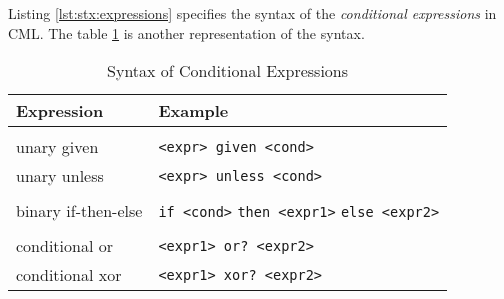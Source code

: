 Listing \ref{lst:stx:expressions} specifies the syntax of
the \emph{conditional expressions} in CML.
The table \ref{tab:conditional-expr-syntax} is another representation of the syntax.

\begin{table}[H]
\centering
\begin{tabular}
{ l l }
\hline
Expression & Example \\
\hline
\\
unary given & \verb|<expr> given <cond>| \\
unary unless & \verb|<expr> unless <cond>| \\
\\
binary if-then-else & \verb|if <cond>| \verb|then <expr1>| \verb|else <expr2>| \\
\\
conditional or & \verb|<expr1> or? <expr2>| \\
conditional xor & \verb|<expr1> xor? <expr2>| \\
\end{tabular}
\caption{Syntax of Conditional Expressions}
\label{tab:conditional-expr-syntax}
\end{table}
